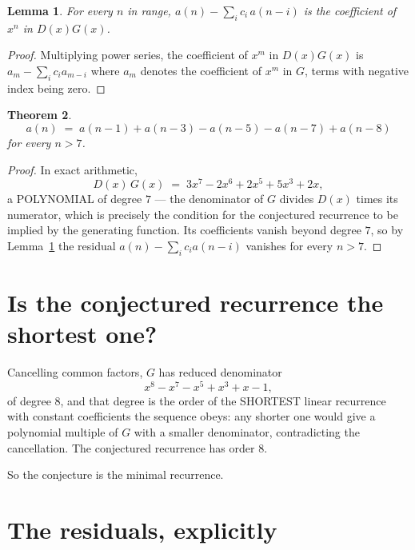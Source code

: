 \documentclass[11pt,a4paper]{article}
\theoremstyle{plain}
\newtheorem{theorem}{Theorem}
\newtheorem{lemma}[theorem]{Lemma}
\theoremstyle{definition}
\begin{document}
\begin{lemma}\label{lem:key}
For every $n$ in range, $a(n)-\sum_i c_i\,a(n-i)$ is the coefficient of $x^{n}$ in
$D(x)G(x)$.
\end{lemma}

\begin{proof}
Multiplying power series, the coefficient of $x^{m}$ in $D(x)G(x)$ is
$a_m-\sum_i c_i a_{m-i}$ where $a_m$ denotes the coefficient of $x^{m}$ in $G$, terms with
negative index being zero.
\end{proof}

\begin{theorem}
\[
a(n)\;=\;a(n-1) + a(n-3) - a(n-5) - a(n-7) + a(n-8)
\]
for every $n>7$.
\end{theorem}

\begin{proof}
In exact arithmetic,
\[
D(x)\,G(x)\;=\;3 x^{7} - 2 x^{6} + 2 x^{5} + 5 x^{3} + 2 x,
\]
a POLYNOMIAL of degree $7$ --- the denominator of $G$ divides $D(x)$ times its numerator,
which is precisely the condition for the conjectured recurrence to be implied by the
generating function. Its coefficients vanish beyond degree $7$, so by
Lemma~\ref{lem:key} the residual $a(n)-\sum_ic_ia(n-i)$ vanishes for every
$n>7$.
\end{proof}

\section{Is the conjectured recurrence the shortest one?}

Cancelling common factors, $G$ has reduced denominator
\[
x^{8} - x^{7} - x^{5} + x^{3} + x - 1,
\]
of degree $8$, and that degree is the order of the SHORTEST linear recurrence with
constant coefficients the sequence obeys: any shorter one would give a polynomial multiple of
$G$ with a smaller denominator, contradicting the cancellation. The conjectured recurrence has
order $8$.

So the conjecture is the minimal recurrence.

\section{The residuals, explicitly}
\end{document}
